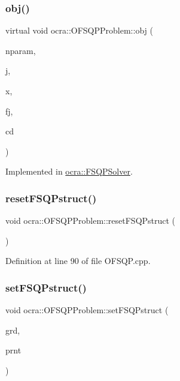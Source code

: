 \subsubsection{\texorpdfstring{obj()}{obj()}}
{\footnotesize\ttfamily virtual void ocra\+::\+O\+F\+S\+Q\+P\+Problem\+::obj (\begin{DoxyParamCaption}\item[{int}]{nparam,  }\item[{int}]{j,  }\item[{double $\ast$}]{x,  }\item[{double $\ast$}]{fj,  }\item[{void $\ast$}]{cd }\end{DoxyParamCaption})\hspace{0.3cm}{\ttfamily [pure virtual]}}



Implemented in \hyperlink{classocra_1_1FSQPSolver_a1275a02361629480cc18d44ce46d915c}{ocra\+::\+F\+S\+Q\+P\+Solver}.

\hypertarget{classocra_1_1OFSQPProblem_a774f1a1e9d5014ea878b8de4750c3a13}{}\label{classocra_1_1OFSQPProblem_a774f1a1e9d5014ea878b8de4750c3a13} 
\subsubsection{\texorpdfstring{reset\+F\+S\+Q\+Pstruct()}{resetFSQPstruct()}}
{\footnotesize\ttfamily void ocra\+::\+O\+F\+S\+Q\+P\+Problem\+::reset\+F\+S\+Q\+Pstruct (\begin{DoxyParamCaption}{ }\end{DoxyParamCaption})}



Definition at line 90 of file O\+F\+S\+Q\+P.\+cpp.

\hypertarget{classocra_1_1OFSQPProblem_ae57b5fa2934e2ae619e748079335d3b7}{}\label{classocra_1_1OFSQPProblem_ae57b5fa2934e2ae619e748079335d3b7} 
\subsubsection{\texorpdfstring{set\+F\+S\+Q\+Pstruct()}{setFSQPstruct()}}
{\footnotesize\ttfamily void ocra\+::\+O\+F\+S\+Q\+P\+Problem\+::set\+F\+S\+Q\+Pstruct (\begin{DoxyParamCaption}\item[{\hyperlink{structocra_1_1fsqpDetails_1_1Grd}{fsqp\+Details\+::\+Grd} \&}]{grd,  }\item[{\hyperlink{structocra_1_1fsqpDetails_1_1Prnt}{fsqp\+Details\+::\+Prnt} \&}]{prnt }\end{DoxyParamCaption})}



